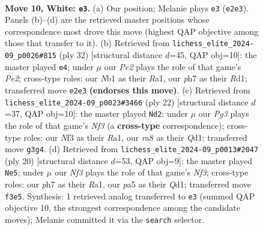 \documentclass[11pt]{article}
\begin{document}
\clearpage

\begin{figure}[p]\centering
\begin{subfigure}{0.46\textwidth}\centering
\resizebox{\linewidth}{!}{%
\newchessgame
\chessboard[
  setfen={rnbq1rk1/1p2bp1p/5np1/p1pp4/P7/1P3NP1/3PPPBP/RNBQ1RK1 w - - 0 10},
  showmover=false,
  pgfstyle=straightmove, color=movearrow, markmove={e2-e3}
]}
\caption{}
\end{subfigure}\hfill
\begin{subfigure}{0.46\textwidth}\centering
\resizebox{\linewidth}{!}{%
\newchessgame
\chessboard[
  setfen={r1bq1rk1/1p2bpp1/2pnp2p/p7/3P4/2P2NP1/P1Q1PPBP/R2RB1K1 w - - 2 17},
  showmover=false,
  pgfstyle=straightmove, color=movearrow, markmove={e2-e4}
]}
\caption{}
\end{subfigure}
\\[4pt]
\begin{subfigure}{0.46\textwidth}\centering
\resizebox{\linewidth}{!}{%
\newchessgame
\chessboard[
  setfen={r1bq1rk1/1pp1bppp/4pn2/nN1p4/P2P4/5NP1/1BP1PPBP/R2Q1RK1 w - - 3 12},
  showmover=false,
  pgfstyle=straightmove, color=movearrow, markmove={f3-d2}
]}
\caption{}
\end{subfigure}\hfill
\begin{subfigure}{0.46\textwidth}\centering
\resizebox{\linewidth}{!}{%
\newchessgame
\chessboard[
  setfen={rn1q1rk1/pbp1bppp/1p3n2/3p4/3P4/1PN2NP1/P2BPPBP/R2Q1RK1 w - - 2 11},
  showmover=false,
  pgfstyle=straightmove, color=movearrow, markmove={f3-e5}
]}
\caption{}
\end{subfigure}
\caption{\textbf{Move 10, White: \texttt{e3}.} (a) Our position; Melanie plays \texttt{e3} (\texttt{e2e3}). Panels (b)--(d) are the retrieved master positions whose correspondence most drove this move (highest QAP objective among those that transfer to it). (b) Retrieved from \texttt{lichess\_elite\_2024-09\_p0026\#815} (ply 32) [structural distance $d$=45, QAP obj=10]: the master played \texttt{e4}; under $\mu$ our \emph{Pe2} plays the role of that game's \emph{Pe2}; cross-type roles: our \emph{N}b1 as their \emph{R}a1, our \emph{p}h7 as their \emph{R}d1; transferred move \texttt{e2e3} \textbf{(endorses this move)}. (c) Retrieved from \texttt{lichess\_elite\_2024-09\_p0023\#3466} (ply 22) [structural distance $d$=37, QAP obj=10]: the master played \texttt{Nd2}; under $\mu$ our \emph{Pg3} plays the role of that game's \emph{Nf3} (a \textbf{cross-type} correspondence); cross-type roles: our \emph{N}f3 as their \emph{R}a1, our \emph{r}a8 as their \emph{Q}d1; transferred move \texttt{g3g4}. (d) Retrieved from \texttt{lichess\_elite\_2024-09\_p0013\#2047} (ply 20) [structural distance $d$=53, QAP obj=9]: the master played \texttt{Ne5}; under $\mu$ our \emph{Nf3} plays the role of that game's \emph{Nf3}; cross-type roles: our \emph{p}h7 as their \emph{R}a1, our \emph{p}a5 as their \emph{Q}d1; transferred move \texttt{f3e5}. Synthesis: 1 retrieved analog transferred to \texttt{e3} (summed QAP objective 10, the strongest correspondence among the candidate moves); Melanie committed it via the \texttt{search} selector.}
\label{fig:thought-m18}
\end{figure}
\end{document}
